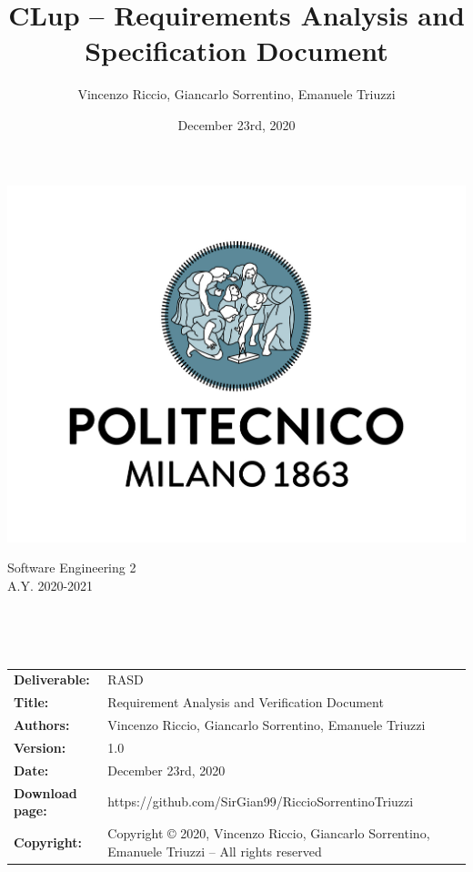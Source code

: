 \documentclass[a4paper,oneside,11pt]{book}   %
\title{\LARGE{CLup -- Requirements Analysis and \newline Specification Document}}
\author{Vincenzo Riccio, Giancarlo Sorrentino, Emanuele Triuzzi}
\date{December 23rd, 2020}
\begin{document}
\begin{titlingpage} 
    \begin{center}
        \includegraphics[height=0.52\linewidth]{pictures/polimi}\\ %
        \begin{large}
            Software Engineering 2 \\
            A.Y. 2020-2021\\
        \end{large}
        \vspace{4cm} %
        \begin{large} 
            \textbf{\thetitle} \\
        \end{large}
        \vspace{0.7cm}
        \theauthor\\
        \vspace{7.3cm} %
        \thedate
    \end{center}
\end{titlingpage}

\newpage
\begin{table}[H]
    \begin{tabu} to \textwidth { X[0.3,r,p] X[0.7,l,p] }
        \hline
        \textbf{Deliverable:}   & RASD\\
        \textbf{Title:}         & Requirement Analysis and Verification Document \\
        \textbf{Authors:}       & Vincenzo Riccio, Giancarlo Sorrentino, \newline Emanuele Triuzzi \\
        \textbf{Version:}       & 1.0 \\ 
        \textbf{Date:}          & December 23rd, 2020 \\
        \textbf{Download page:} & https://github.com/SirGian99/RiccioSorrentinoTriuzzi \\
        \textbf{Copyright:}     & Copyright © 2020, Vincenzo Riccio, Giancarlo Sorrentino, Emanuele Triuzzi -- All rights reserved \\
        \hline
    \end{tabu}
\end{table}
\end{document}
